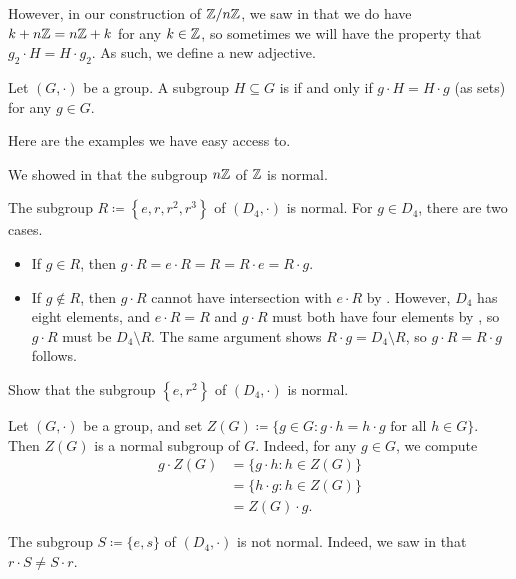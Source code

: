 \documentclass[../notes.tex]{subfiles}
\begin{document}
However, in our construction of $\mathbb Z/n\mathbb Z$, we saw in  that we do have $k+n\mathbb Z=n\mathbb Z+k$ for any $k\in\mathbb Z$, so sometimes we will have the property that $g_2\cdot H=H\cdot g_2$. As such, we define a new adjective.
\begin{definition}[normal]
    Let $(G,\cdot)$ be a group. A subgroup $H\subseteq G$ is  if and only if $g\cdot H=H\cdot g$ (as sets) for any $g\in G$.
\end{definition}
Here are the examples we have easy access to.
\begin{example}
    We showed in  that the subgroup $n\mathbb Z$ of $\mathbb Z$ is normal.
\end{example}
\begin{example}
    The subgroup $R\coloneqq\left\{e,r,r^2,r^3\right\}$ of $(D_4,\cdot)$ is normal. For $g\in D_4$, there are two cases.
    \begin{itemize}
        \item If $g\in R$, then $g\cdot R=e\cdot R=R=R\cdot e=R\cdot g$.
        \item If $g\notin R$, then $g\cdot R$ cannot have intersection with $e\cdot R$ by . However, $D_4$ has eight elements, and $e\cdot R=R$ and $g\cdot R$ must both have four elements by , so $g\cdot R$ must be $D_4\setminus R$. The same argument shows $R\cdot g=D_4\setminus R$, so $g\cdot R=R\cdot g$ follows.
    \end{itemize}
\end{example}
\begin{exercise}
    Show that the subgroup $\left\{e,r^2\right\}$ of $(D_4,\cdot)$ is normal.
\end{exercise}
\begin{example}
    Let $(G,\cdot)$ be a group, and set $Z(G)\coloneqq\{g\in G:g\cdot h=h\cdot g\text{ for all }h\in G\}$. Then $Z(G)$ is a normal subgroup of $G$. Indeed, for any $g\in G$, we compute
    \begin{align*}
        g\cdot Z(G) &= \{g\cdot h:h\in Z(G)\} \\
        &= \{h\cdot g:h\in Z(G)\} \\
        &= Z(G)\cdot g.
    \end{align*}
\end{example}
\begin{nex}
    The subgroup $S\coloneqq\{e,s\}$ of $(D_4,\cdot)$ is not normal. Indeed, we saw in  that $r\cdot S\ne S\cdot r$.
\end{nex}
\end{document}
